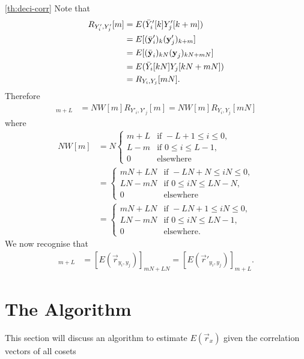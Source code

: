 \documentclass[a4paper, openany, oneside]{memoir}
\begin{document}
\begin{blockProofTheorem}{\ref{th:deci-corr}}
    Note that
    \begin{align*}
        R_{Y'_i,Y'_j}[m]
        &= E(\bar{Y}'_i[k]Y'_j[k+m]) \\
        &= E[(\bar{\boldsymbol{\mathbf{y}}}'_i)_{k}(\boldsymbol{\mathbf{y}}'_j)_{k+m}] \\
        &= E[(\bar{\boldsymbol{\mathbf{y}}}_i)_{kN}(\boldsymbol{\mathbf{y}}_j)_{kN+mN}] \\
        &= E(\bar{Y}_i[kN]Y_j[kN+mN]) \\
        &= R_{Y_i,Y_j}[mN].
    \end{align*}
    Therefore
    \begin{align*}
        [E(N\vec{r}_{y'_i,y'_j})]_{m+L}
        &= N W[m] R_{Y'_i,Y'_j}[m]
        = N W[m] R_{Y_i,Y_j}[mN]
    \end{align*}
    where
    \begin{align*}
        NW[m] &= N\begin{cases}
            m+L & \text{if } -L+1 \le i \le 0, \\
            L-m & \text{if } 0 \le i \le L - 1, \\
            0 & \text{elsewhere}
        \end{cases} \\
        &= \begin{cases}
            mN+LN & \text{if } -LN+N \le iN \le 0, \\
            LN-mN & \text{if } 0 \le iN \le LN - N,\\
            0 & \text{elsewhere}
        \end{cases} \\
        &= \begin{cases}
            mN+LN & \text{if } -LN+1 \le iN \le 0, \\
            LN-mN & \text{if } 0 \le iN \le LN - 1, \\
            0 & \text{elsewhere}.
        \end{cases}
    \end{align*}
    We now recognise that
    \begin{align*}
        [E(N\vec{r}_{y'_i,y'_j})]_{m+L} &= [E(\vec{r}_{y_i,y_j})]_{mN+LN} = [E(\vec{r}'_{y_i,y_j})]_{m+L} .
    \end{align*}
\end{blockProofTheorem}

\section{The Algorithm}
This section will discuss an algorithm to estimate $E(\vec{r}_x)$ given the correlation vectors of all cosets
\end{document}
